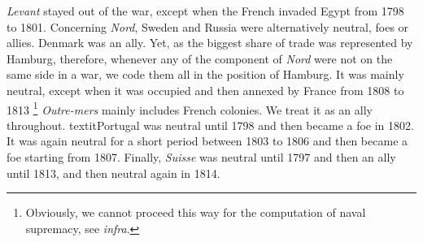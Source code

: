 \documentclass[12pt,a4paper,notitlepage,english]{article}
\begin{document}
\textit{Levant} stayed out of the war, except when the French invaded Egypt from 1798 to 1801.
Concerning \textit{Nord}, Sweden and Russia were alternatively neutral, foes or allies. Denmark was an ally. Yet, as the biggest share of trade was represented by Hamburg, therefore, whenever any of the component of \textit{Nord} were not on the same side in a war, we code them all in the position of Hamburg. It was mainly neutral, except when it was occupied and then annexed by France from 1808 to 1813 \footnote{Obviously, we cannot proceed this way for the computation of naval supremacy, see \textit{infra}.}
\textit{Outre-mers} mainly includes French colonies. We treat it as an ally throughout.
textit{Portugal} was neutral until 1798 and then became a foe in 1802.
It was again neutral for a short period between 1803 to 1806 and then became a foe starting from 1807.
Finally, \textit{Suisse} was neutral until 1797 and then an ally until 1813, and then neutral again in 1814. \\
\end{document}
